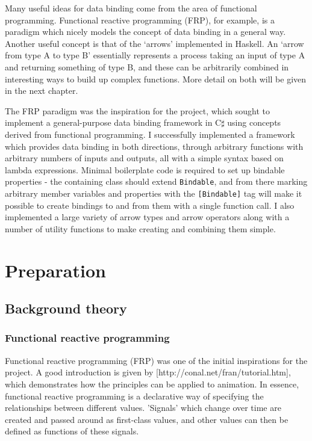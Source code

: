 \documentclass[12pt,twoside,notitlepage]{report}
\begin{document}
Many useful ideas for data binding come from the area of functional programming. Functional reactive programming (FRP), for example, is a paradigm which nicely models the concept of data binding in a general way. Another useful concept is that of the `arrows' implemented in Haskell. An `arrow from type A to type B' essentially represents a process taking an input of type A and returning something of type B, and these can be arbitrarily combined in interesting ways to build up complex functions. More detail on both will be given in the next chapter.

The FRP paradigm was the inspiration for the project, which sought to implement a general-purpose data binding framework in C$\sharp$ using concepts derived from functional programming. I successfully implemented a framework which provides data binding in both directions, through arbitrary functions with arbitrary numbers of inputs and outputs, all with a simple syntax based on lambda expressions. Minimal boilerplate code is required to set up bindable properties - the containing class should extend \texttt{Bindable}, and from there marking arbitrary member variables and properties with the \texttt{[Bindable]} tag will make it possible to create bindings to and from them with a single function call. I also implemented a large variety of arrow types and arrow operators along with a number of utility functions to make creating and combining them simple.

\cleardoublepage



\chapter{Preparation}

\section{Background theory}

\subsection{Functional reactive programming}

Functional reactive programming (FRP) was one of the initial inspirations for the project. A good introduction is given by [http://conal.net/fran/tutorial.htm], which demonstrates how the principles can be applied to animation. In essence, functional reactive programming is a declarative way of specifying the relationships between different values. 'Signals' which change over time are created and passed around as first-class values, and other values can then be defined as functions of these signals.
\end{document}
